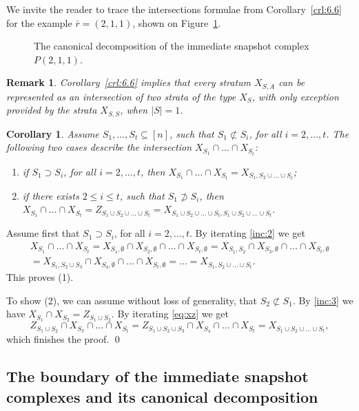 \documentclass{amsart}[10pt]
\newtheorem{crl}[theorem]{Corollary}
\newtheorem{rem}[theorem]{Remark}
\newcommand{\pr}{\nin{\bf Proof.} }
\newcommand{\es}{\emptyset}
\newcommand{\tr}{{\bar r}}
\numberwithin{equation}{section}
\numberwithin{figure}{section}
\numberwithin{table}{section}
\def\pstexInput#1{
  
}
\begin{document}
\nin We invite the reader to trace the intersections formulae from
Corollary~\ref{crl:6.6} for the example $\tr=(2,1,1)$, shown on
Figure~\ref{fig:f211b}.

\begin{figure}[hbt]
\pstexInput{f211b}
\caption{The canonical decomposition of the immediate snapshot complex $P(2,1,1)$.}
\label{fig:f211b}
\end{figure}

\begin{rem}
Corollary~\ref{crl:6.6} implies that every stratum $X_{S,A}$ can be
represented as an intersection of two strata of the type $X_S$, with
only exception provided by the strata $X_{S,S}$, when $|S|=1$.
\end{rem}

\begin{crl}\label{crl:inter}
Assume $S_1,\dots,S_t\subseteq[n]$, such that $S_1\not\subset S_i$,
for all $i=2,\dots,t$. The following two cases describe the
intersection $X_{S_1}\cap\dots\cap X_{S_t}$:
\begin{enumerate}
\item[(1)] if $S_1\supset S_i$, for all $i=2,\dots,t$, then
  $X_{S_1}\cap\dots\cap X_{S_t}=X_{S_1,S_2\cup\dots\cup S_t}$;
\item[(2)] if there exists $2\leq i\leq t$, such that $S_1\not\supset S_i$,
  then $X_{S_1}\cap\dots\cap X_{S_t}=Z_{S_1\cup S_2\cup\dots\cup S_t}
  =X_{S_1\cup S_2\cup\dots\cup S_t,S_1\cup S_2\cup\dots\cup S_t}$.
\end{enumerate}
\end{crl}
\pr Assume first that $S_1\supset S_i$, for all $i=2,\dots,t$. By iterating
\eqref{inc:2} we get
\begin{multline*} X_{S_1}\cap\dots\cap X_{S_t}=X_{S_1,\es}\cap X_{S_2,\es}\cap\dots 
\cap X_{S_t,\es}= X_{S_1,S_2}\cap X_{S_3,\es}\cap\dots\cap
X_{S_t,\es}\\ =X_{S_1,S_2\cup S_3}\cap X_{S_4,\es}\cap\dots\cap
X_{S_t,\es}=\dots=X_{S_1,S_2\cup\dots\cup S_t}.
\end{multline*}
This proves (1). 

To show (2), we can assume without loss of generality, that 
$S_2\not\subset S_1$.  By \eqref{inc:3} we have $X_{S_1}\cap X_{S_2}=Z_{S_1\cup S_2}$.  
By iterating \eqref{eq:xz} we get
\[
Z_{S_1\cup S_2}\cap X_{S_3}\cap\dots\cap X_{S_t}=Z_{S_1\cup S_2\cup
  S_3}\cap X_{S_4}\cap\dots\cap X_{S_t} =X_{S_1\cup S_2\cup\dots\cup
  S_t},
\]
which finishes the proof.
\qed

\subsection{The boundary of the immediate snapshot complexes and its canonical 
decomposition }
\end{document}
